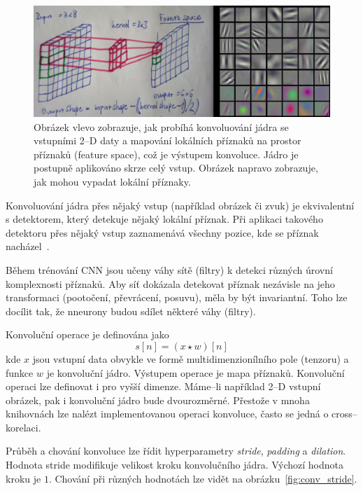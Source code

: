 \begin{figure}[H]
    \centering
    \includegraphics[scale=0.35]{obrazky-figures/cnnfeatures.png}
    \caption{\label{fig:conv_nn_image_feature}Obrázek vlevo zobrazuje, jak probíhá konvoluování jádra se vstupními 2--D daty a mapování lokálních příznaků na prostor příznaků (feature space), což je výstupem konvoluce. Jádro je postupně aplikováno skrze celý vstup. Obrázek napravo zobrazuje, jak mohou vypadat lokální příznaky.}
\end{figure}


Konvoluování jádra přes nějaký vstup (například obrázek či zvuk) je ekvivalentní s detektorem, který detekuje nějaký lokální příznak. Při aplikaci takového detektoru přes nějaký vstup zaznamenává všechny pozice, kde se příznak nacházel~\cite{mitdeeplearning_small}.

Během trénování CNN jsou učeny váhy sítě (filtry) k detekci různých úrovní komplexnosti příznaků. Aby síť dokázala detekovat příznak nezávisle na jeho transformaci (pootočení, převrácení, posuvu), měla by být invariantní. Toho lze docílit tak, že nneurony budou sdílet některé váhy (filtry).


Konvoluční operace je definována jako
\begin{equation}
   s[n] = (x \star w)[n]
\end{equation}
kde $x$ jsou vstupní data obvykle ve formě multidimenzionílního pole (tenzoru) a funkce $w$ je konvoluční jádro. Výstupem operace je mapa příznaků. Konvoluční operaci lze definovat i pro vyšší dimenze. Máme--li například 2--D vstupní obrázek, pak i konvoluční jádro bude dvourozměrné. Přestože v mnoha knihovnách lze nalézt implementovanou operaci konvoluce, často se jedná o cross--korelaci.


Průběh a chování konvoluce lze řídit hyperparametry \textit{stride}, \textit{padding} a \textit{dilation}. Hodnota stride modifikuje velikost kroku konvolučního jádra. Výchozí hodnota kroku je $1$. Chování při různých hodnotách lze vidět na obrázku~\ref{fig:conv_stride}. 

